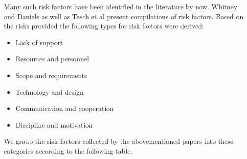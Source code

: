Many such risk factors have been identified in the literature by now. Whitney and Daniels \cite{whitneyRootCauseFailure2013} as well as Tesch et al \cite{teschITProjectRisk2007} present compilations of risk factors. Based on the risks provided the following types for risk factors were derived:
 \begin{itemize}	
 	\item	Lack of support
 	\item	Resources and personnel	
 	\item	Scope and requirements	
 	\item	Technology and design	
 	\item	Communication and cooperation
 	\item	Discipline and motivation
\end{itemize}		
We group the risk factors collected by the abovementioned papers into these categories according to the following table.

